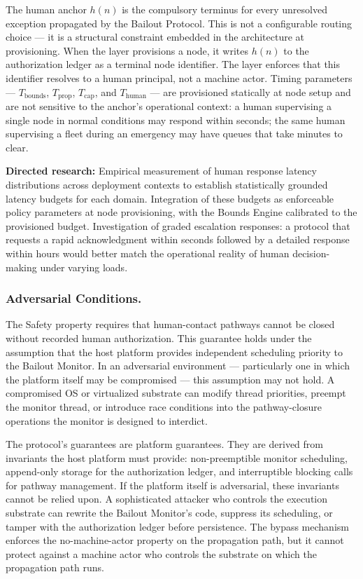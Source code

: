 The human anchor $h(n)$ is the compulsory terminus for every unresolved exception propagated by the Bailout Protocol. This is not a configurable routing choice --- it is a structural constraint embedded in the architecture at provisioning. When the \purpose{} layer provisions a node, it writes $h(n)$ to the authorization ledger as a terminal node identifier. The \fact{} layer enforces that this identifier resolves to a human principal, not a machine actor. Timing parameters --- $T_{\mathrm{bounds}}$, $T_{\mathrm{prop}}$, $T_{\mathrm{cap}}$, and $T_{\mathrm{human}}$ --- are provisioned statically at node setup and are not sensitive to the anchor's operational context: a human supervising a single node in normal conditions may respond within seconds; the same human supervising a fleet during an emergency may have queues that take minutes to clear.

\medskip\noindent\textbf{Directed research:} Empirical measurement of human response latency distributions across deployment contexts to establish statistically grounded latency budgets for each domain. Integration of these budgets as enforceable policy parameters at node provisioning, with the Bounds Engine calibrated to the provisioned budget. Investigation of graded escalation responses: a protocol that requests a rapid acknowledgment within seconds followed by a detailed response within hours would better match the operational reality of human decision-making under varying loads.

\subsubsection{Adversarial Conditions.}
The Safety property requires that human-contact pathways cannot be closed without recorded human authorization. This guarantee holds under the assumption that the host platform provides independent scheduling priority to the Bailout Monitor. In an adversarial environment --- particularly one in which the platform itself may be compromised --- this assumption may not hold. A compromised OS or virtualized substrate can modify thread priorities, preempt the monitor thread, or introduce race conditions into the pathway-closure operations the monitor is designed to interdict.

The protocol's guarantees are platform guarantees. They are derived from invariants the host platform must provide: non-preemptible monitor scheduling, append-only storage for the authorization ledger, and interruptible blocking calls for pathway management. If the platform itself is adversarial, these invariants cannot be relied upon. A sophisticated attacker who controls the execution substrate can rewrite the Bailout Monitor's code, suppress its scheduling, or tamper with the authorization ledger before persistence. The bypass mechanism enforces the no-machine-actor property on the propagation path, but it cannot protect against a machine actor who controls the substrate on which the propagation path runs.

